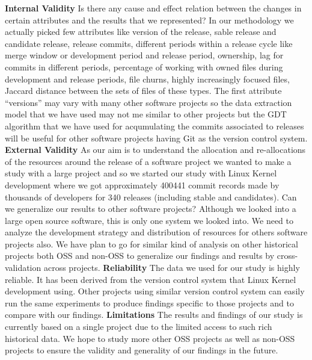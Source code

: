 \documentclass{acm_proc_article-sp}
\begin{document}
\textbf{Internal Validity} Is there any cause and effect relation between the changes in certain attributes and the results that we represented? In our methodology we actually picked few attributes like version of the release, sable release and candidate release, release commits, different periods within a release cycle like merge window or development period and release period, ownership, lag for commits in different periods, percentage of working with owned files during development and release periods, file churns, highly increasingly focused files, Jaccard distance between the sets of files of these types. The first attribute ``versions'' may vary with many other software projects so the data extraction model that we have used may not me similar to other projects but the GDT algorithm that we have used for acqumulating the commits associated to releases will be useful for other software projects having Git as the version control system.\newline\newline
\textbf{External Validity} As our aim is to understand the allocation and re-allocations of the resources around the release of a software project we wanted to make a study with a large project and so we started our study with Linux Kernel development where we got approximately 400441 commit records made by thousands of developers for 340 releases (including stable and candidates). Can we generalize our results to other software projects? Although we looked into a large open source software, this is only one system we looked into. We need to analyze the development strategy and distribution of resources for others software projects also. We have plan to go for similar kind of analysis on other historical projects both OSS and non-OSS to generalize our findings and results by cross-validation across projects.\newline\newline
\textbf{Reliability} The data we used for our study is highly reliable. It has been derived from the version control system that Linux Kernel development using. Other projects using similar version control system can easily run the same experiments to produce findings specific to those projects and to compare with our findings.\newline\newline
\textbf{Limitations} The results and findings of our study is currently based on a single project due to the limited access to such rich historical data. We hope to study more other OSS projects as well as non-OSS projects to ensure the validity and generality of our findings in the future.
\end{document}
